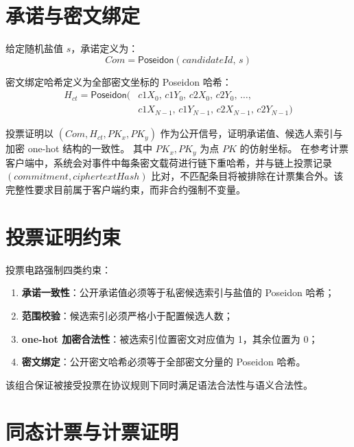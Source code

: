 \section{承诺与密文绑定}

给定随机盐值 $s$，承诺定义为：
\begin{equation}
\mathit{Com} = \mathsf{Poseidon}(\mathit{candidateId},\, s)
\end{equation}

密文绑定哈希定义为全部密文坐标的 Poseidon 哈希：
\begin{equation}
\begin{split}
H_{ct} = \mathsf{Poseidon}(&\mathit{c1X}_0,\,\mathit{c1Y}_0,\,\mathit{c2X}_0,\,\mathit{c2Y}_0,\,\dots,\\
                  &\mathit{c1X}_{N-1},\,\mathit{c1Y}_{N-1},\,\mathit{c2X}_{N-1},\,\mathit{c2Y}_{N-1})
\end{split}
\end{equation}

投票证明以 $(\mathit{Com}, H_{ct}, PK_x, PK_y)$ 作为公开信号，证明承诺值、候选人索引与加密 one-hot 结构的一致性。
其中 $PK_x, PK_y$ 为点 $\mathit{PK}$ 的仿射坐标。
在参考计票客户端中，系统会对事件中每条密文载荷进行链下重哈希，并与链上投票记录 $(\mathit{commitment}, \mathit{ciphertextHash})$ 比对，不匹配条目将被排除在计票集合外。该完整性要求目前属于客户端约束，而非合约强制不变量。

\section{投票证明约束}

投票电路强制四类约束：
\begin{enumerate}
    \item \textbf{承诺一致性}：公开承诺值必须等于私密候选索引与盐值的 Poseidon 哈希；
    \item \textbf{范围校验}：候选索引必须严格小于配置候选人数；
    \item \textbf{one-hot 加密合法性}：被选索引位置密文对应值为 1，其余位置为 0；
    \item \textbf{密文绑定}：公开密文哈希必须等于全部密文分量的 Poseidon 哈希。
\end{enumerate}

该组合保证被接受投票在协议规则下同时满足语法合法性与语义合法性。

\section{同态计票与计票证明}

